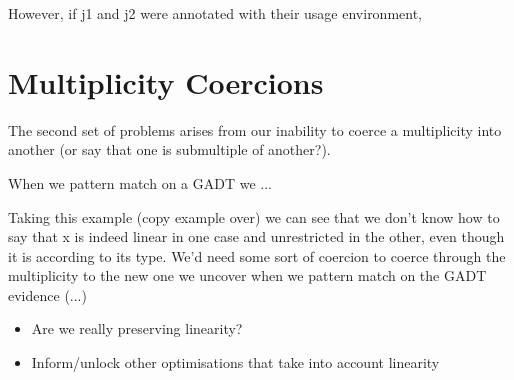 \documentclass{article}
\begin{document}
However, if j1 and j2 were annotated with their usage environment,


\section{Multiplicity Coercions}

The second set of problems arises from our inability to coerce a multiplicity
into another (or say that one is submultiple of another?).

When we pattern match on a GADT we ...

Taking this example (copy example over) we can see that we don't know how to say
that x is indeed linear in one case and unrestricted in the other, even though
it is according to its type. We'd need some sort of coercion to coerce through
the multiplicity to the new one we uncover when we pattern match on the GADT
evidence (...)

\begin{itemize}
    \item Are we really preserving linearity?
    \item Inform/unlock other optimisations that take into account linearity
\end{itemize}
\end{document}
